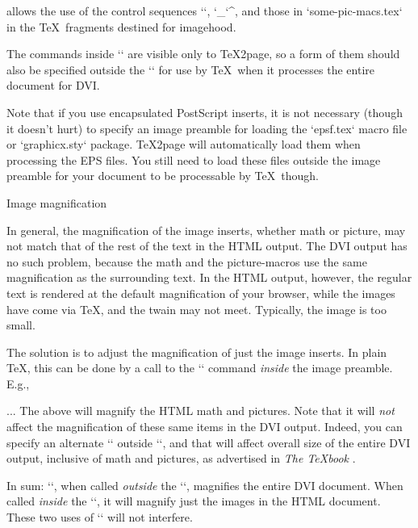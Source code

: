 {{{{{{{{{\begintt
\ifx\shipout\UnDeFiNeD %
  \imgpreamble
    
    \let\gO\Omega
    \def\I#1#2{\int_{#1}^#2}
  \endimgpreamble
\fi
\endtt
%
allows the use of the control sequences `\gO`,
`\I`, and those in `some-pic-macs.tex` in the
\TeX\ fragments destined for imagehood.

The commands inside `\imgpreamble` are visible only
to \TeX2page, so a form of them should also be
specified outside the `\imgpreamble` for use by \TeX\
when it processes the entire document for DVI.

Note that if you use encapsulated PostScript inserts,
it is not necessary (though it doesn’t hurt) to
specify an image preamble for loading the `epsf.tex`
macro file or `graphicx.sty` package.  \TeX2page will
automatically load them when processing the EPS files.
You still need to load these files outside the image
preamble for your document to be processable by \TeX\
though.

\beginsection Image magnification

%
In general, the magnification of the image
inserts, whether math or picture, may not match that
of the rest of the text in the HTML output.  The DVI
output has no such problem, because the math and
the picture-macros use the same magnification as the
surrounding text.  In the HTML output, however, the
regular text is rendered at the default magnification
of your browser, while the images have come via \TeX,
and the twain may not meet.  Typically, the image is
too small.

The solution is to adjust the magnification of  just
the image inserts.  In plain \TeX, this can be
done by a call to the `\magnification` command {\em
inside} the image preamble.  E.g.,

\begintt
\ifx\shipout\UnDeFiNeD
  \imgpreamble
    \magnification{}
    ...
  \endimgpreamble
\fi
\endtt
%
The above will magnify the HTML math and pictures.
Note that it will {\em not} affect the magnification
of these same items in the DVI output.  Indeed,
you can specify an alternate `\magnification`
outside `\imgpreamble`, and that will affect
overall size of the entire DVI output, inclusive of
math and pictures, as advertised in {\em The \TeX book}
\cite{texbook}.

In sum: `\magnification`, when called {\em
outside} the `\imgpreamble`, magnifies the
entire DVI document.  When called {\em inside}
the `\imgpreamble`, it will magnify  just the
images in the HTML document.  These two uses
of `\magnification` will not interfere.

}}}}}}}}}
